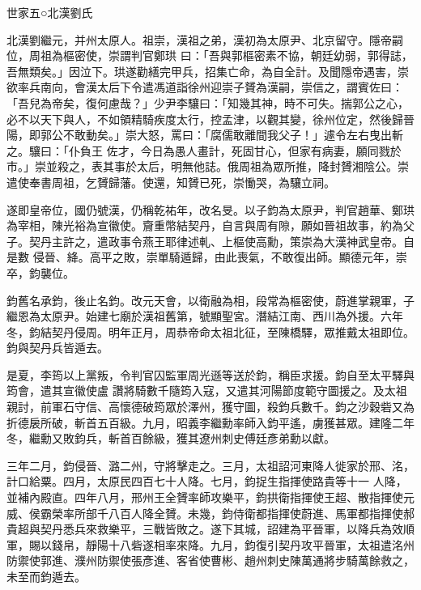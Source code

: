 
\begin{pinyinscope}

 世家五○北漢劉氏



 北漢劉繼元，并州太原人。祖崇，漢祖之弟，漢初為太原尹、北京留守。隱帝嗣位，周祖為樞密使，崇謂判官鄭珙
 曰：「吾與郭樞密素不協，朝廷幼弱，郭得誌，吾無類矣。」因泣下。珙遂勸繕完甲兵，招集亡命，為自全計。及聞隱帝遇害，崇欲率兵南向，會漢太后下令遣馮道詣徐州迎崇子贇為漢嗣，崇信之，謂賓佐曰：「吾兒為帝矣，復何慮哉？」少尹李驤曰：「知幾其神，時不可失。揣郭公之心，必不以天下與人，不如領精騎疾度太行，控孟津，以觀其變，徐州位定，然後歸晉陽，即郭公不敢動矣。」崇大怒，罵曰：「腐儒敢離間我父子！」遽令左右曳出斬之。驤曰：「仆負王
 佐才，今日為愚人畫計，死固甘心，但家有病妻，願同戮於市。」崇並殺之，表其事於太后，明無他誌。俄周祖為眾所推，降封贇湘陰公。崇遣使奉書周祖，乞贇歸藩。使還，知贇已死，崇慟哭，為驤立祠。



 遂即皇帝位，國仍號漢，仍稱乾祐年，改名旻。以子鈞為太原尹，判官趙華、鄭珙為宰相，陳光裕為宣徽使。齎重幣結契丹，自言與周有隙，願如晉祖故事，約為父子。契丹主許之，遣政事令燕王耶律述軋、上樞使高勳，策崇為大漢神武皇帝。自是數
 侵晉、絳。高平之敗，崇單騎遁歸，由此喪氣，不敢復出師。顯德元年，崇卒，鈞襲位。



 鈞舊名承鈞，後止名鈞。改元天會，以衛融為相，段常為樞密使，蔚進掌親軍，子繼恩為太原尹。始建七廟於漢祖舊第，號顯聖宮。潛結江南、西川為外援。六年冬，鈞結契丹侵周。明年正月，周恭帝命太祖北征，至陳橋驛，眾推戴太祖即位。鈞與契丹兵皆遁去。



 是夏，李筠以上黨叛，令判官囚監軍周光遜等送於鈞，稱臣求援。鈞自至太平驛與筠會，遣其宣徽使盧
 讚將騎數千隨筠入寇，又遣其河陽節度範守圖援之。及太祖親討，前軍石守信、高懷德破筠眾於澤州，獲守圖，殺鈞兵數千。鈞之沙穀砦又為折德扆所破，斬首五百級。九月，昭義李繼勳率師入鈞平遙，虜獲甚眾。建隆二年冬，繼勳又敗鈞兵，斬首百餘級，獲其遼州刺史傅廷彥弟勳以獻。



 三年二月，鈞侵晉、潞二州，守將擊走之。三月，太祖詔河東降人徙家於邢、洺，計口給粟。四月，太原民四百七十人降。七月，鈞捉生指揮使路貴等十一
 人降，並補內殿直。四年八月，邢州王全贇率師攻樂平，鈞拱衛指揮使王超、散指揮使元威、侯霸榮率所部千八百人降全贇。未幾，鈞侍衛都指揮使蔚進、馬軍都指揮使郝貴超與契丹悉兵來救樂平，三戰皆敗之。遂下其城，詔建為平晉軍，以降兵為效順軍，賜以錢帛，靜陽十八砦遂相率來降。九月，鈞復引契丹攻平晉軍，太祖遣洺州防禦使郭進、濮州防禦使張彥進、客省使曹彬、趙州刺史陳萬通將步騎萬餘救之，未至而鈞遁去。




\end{pinyinscope}
